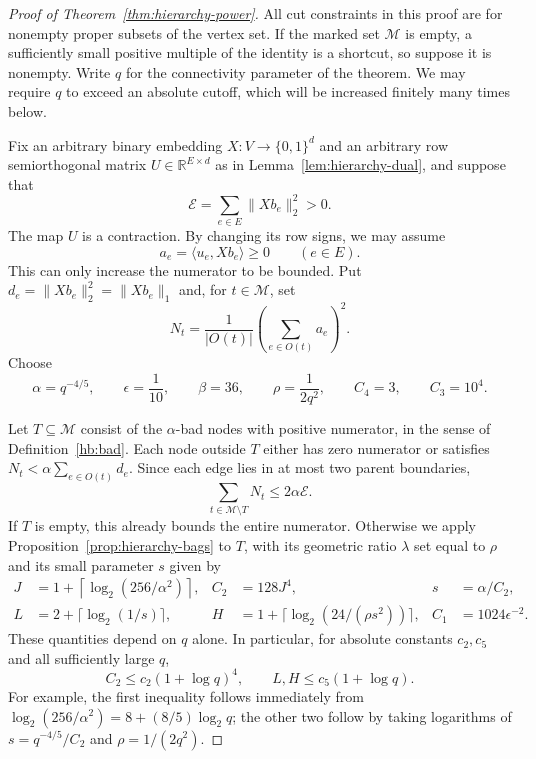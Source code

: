 \documentclass[11pt]{amsart}
\theoremstyle{definition}
\theoremstyle{remark}
\numberwithin{equation}{section}
\begin{document}
\begin{proof}[Proof of Theorem~\ref{thm:hierarchy-power}]
All cut constraints in this proof are for nonempty proper subsets of
the vertex set.  If the marked set $\mathcal M$ is empty, a sufficiently
small positive multiple of the identity is a shortcut, so suppose it
is nonempty.  Write $q$ for the connectivity parameter of the
theorem.  We may require $q$ to exceed an absolute cutoff, which will
be increased finitely many times below.

Fix an arbitrary binary embedding $X:V\to\{0,1\}^d$ and an arbitrary
row semiorthogonal matrix $U\in\mathbb R^{E\times d}$ as in
Lemma~\ref{lem:hierarchy-dual}, and suppose that
\[
 \mathcal E=\sum_{e\in E}\|Xb_e\|_2^2>0.
\]
The map $U$ is a contraction.  By changing its row signs, we may
assume
\[
 a_e=\langle u_e,Xb_e\rangle\ge0
 \qquad(e\in E).
\]
This can only increase the numerator to be bounded.  Put
$d_e=\|Xb_e\|_2^2=\|Xb_e\|_1$ and, for $t\in\mathcal M$, set
\[
 N_t=\frac{1}{|O(t)|}\left(\sum_{e\in O(t)}a_e\right)^2.
\]
Choose
\begin{equation}\label{hp:parameters}
 \alpha=q^{-4/5},\qquad \epsilon=\frac1{10},\qquad
 \beta=36,\qquad \rho=\frac1{2q^2},\qquad
 C_4=3,\qquad C_3=10^4.
\end{equation}

Let $T\subseteq\mathcal M$ consist of the $\alpha$-bad nodes with
positive numerator, in the sense of Definition~\ref{hb:bad}.
Each node outside $T$ either has zero numerator or satisfies
$N_t<\alpha\sum_{e\in O(t)}d_e$.  Since each edge lies in at most
two parent boundaries,
\begin{equation}\label{hp:good}
 \sum_{t\in\mathcal M\setminus T}N_t\le2\alpha\mathcal E.
\end{equation}
If $T$ is empty, this already bounds the entire numerator.  Otherwise
we apply Proposition~\ref{prop:hierarchy-bags} to $T$, with its geometric
ratio $\lambda$ set equal to $\rho$ and its small parameter $s$ given by
\begin{equation}\label{hp:small-parameters}
 \begin{aligned}
 J&=1+\left\lceil\log_2(256/\alpha^2)\right\rceil,
 &C_2&=128J^4,
 &s&=\alpha/C_2,\\
 L&=2+\lceil\log_2(1/s)\rceil,
 &H&=1+\lceil\log_2(24/(\rho s^2))\rceil,
 &C_1&=1024\epsilon^{-2}.
 \end{aligned}
\end{equation}
These quantities depend on $q$ alone.  In particular, for absolute
constants $c_2,c_5$ and all sufficiently large $q$,
\begin{equation}\label{hp:log-growth}
 C_2\le c_2(1+\log q)^4,
 \qquad L,H\le c_5(1+\log q).
\end{equation}
For example, the first inequality follows immediately from
$\log_2(256/\alpha^2)=8+(8/5)\log_2q$; the other two follow by taking
logarithms of $s=q^{-4/5}/C_2$ and $\rho=1/(2q^2)$.


\end{proof}
\end{document}
